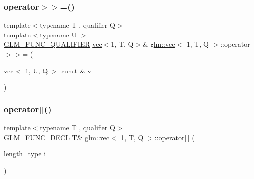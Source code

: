 \mbox{\label{structglm_1_1vec_3_011_00_01_t_00_01_q_01_4_a5f338e27a69533420079adc1daaab092}} 
\subsubsection{\texorpdfstring{operator$>$$>$=()}{operator>>=()}\hspace{0.1cm}{\footnotesize\ttfamily [4/4]}}
{\footnotesize\ttfamily template$<$typename T , qualifier Q$>$ \\
template$<$typename U $>$ \\
\mbox{\hyperlink{setup_8hpp_a33fdea6f91c5f834105f7415e2a64407}{G\+L\+M\+\_\+\+F\+U\+N\+C\+\_\+\+Q\+U\+A\+L\+I\+F\+I\+ER}} \mbox{\hyperlink{structglm_1_1vec}{vec}}$<$1, T, Q$>$\& \mbox{\hyperlink{structglm_1_1vec}{glm\+::vec}}$<$ 1, T, Q $>$\+::operator$>$$>$= (\begin{DoxyParamCaption}\item[{\mbox{\hyperlink{structglm_1_1vec}{vec}}$<$ 1, U, Q $>$ const \&}]{v }\end{DoxyParamCaption})}

\mbox{\label{structglm_1_1vec_3_011_00_01_t_00_01_q_01_4_a3ddc7f24ef7c4820534a14043fb51946}} 
\subsubsection{\texorpdfstring{operator[]()}{operator[]()}\hspace{0.1cm}{\footnotesize\ttfamily [1/2]}}
{\footnotesize\ttfamily template$<$typename T , qualifier Q$>$ \\
\mbox{\hyperlink{setup_8hpp_ab2d052de21a70539923e9bcbf6e83a51}{G\+L\+M\+\_\+\+F\+U\+N\+C\+\_\+\+D\+E\+CL}} T\& \mbox{\hyperlink{structglm_1_1vec}{glm\+::vec}}$<$ 1, T, Q $>$\+::operator\mbox{[}$\,$\mbox{]} (\begin{DoxyParamCaption}\item[{\mbox{\hyperlink{structglm_1_1vec_3_011_00_01_t_00_01_q_01_4_a37415eee3b59cf93cdb752a2b30fe5e6}{length\+\_\+type}}}]{i }\end{DoxyParamCaption})}

